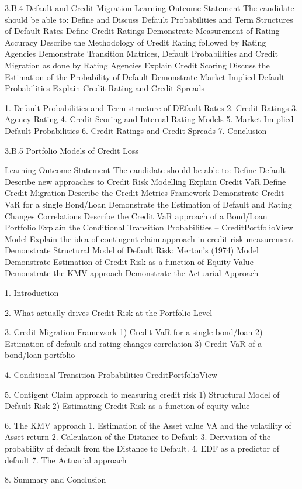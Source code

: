 3.B.4 Default and Credit Migration
Learning Outcome Statement
The candidate should be able to:
 Define and Discuss Default Probabilities and Term Structures of
Default Rates
 Define Credit Ratings
 Demonstrate Measurement of Rating Accuracy
 Describe the Methodology of Credit Rating followed by Rating Agencies
 Demonstrate Transition Matrices, Default Probabilities and Credit Migration
as done by Rating Agencies
 Explain Credit Scoring
 Discuss the Estimation of the Probability of Default
 Demonstrate Market-Implied Default Probabilities
 Explain Credit Rating and Credit Spreads

1. Default Probabilities and Term structure of DEfault Rates
2. Credit Ratings
3. Agency Rating
4. Credit Scoring and Internal Rating Models
5. Market Im plied Default Probabilities
6. Credit Ratings and Credit Spreads
7. Conclusion

3.B.5 Portfolio Models of Credit Loss

Learning Outcome Statement
The candidate should be able to:
 Define Default
 Describe new approaches to Credit Risk Modelling
 Explain Credit VaR
 Define Credit Migration
 Describe the Credit Metrics Framework
 Demonstrate Credit VaR for a single Bond/Loan
 Demonstrate the Estimation of Default and Rating Changes Correlations
 Describe the Credit VaR approach of a Bond/Loan Portfolio
 Explain the Conditional Transition Probabilities – CreditPortfolioView Model
 Explain the idea of contingent claim approach in credit risk measurement
 Demonstrate Structural Model of Default Risk: Merton’s (1974) Model
 Demonstrate Estimation of Credit Risk as a function of Equity Value
 Demonstrate the KMV approach
 Demonstrate the Actuarial Approach

1. Introduction

2. What actually drives Credit Risk at the Portfolio Level

3. Credit Migration Framework
 1) Credit VaR for a single bond/loan
 2) Estimation of default and rating changes correlation
 3) Credit VaR of a bond/loan portfolio

4. Conditional Transition Probabilities CreditPortfolioView

5. Contigent Claim approach to measuring credit risk
 1) Structural Model of Default Risk
 2) Estimating Credit Risk as a function of equity value

6. The KMV approach
	1. Estimation of the Asset value VA and the volatility of Asset return
	2. Calculation of the Distance to Default
	3. Derivation of the probability of default from the Distance to Default.
	4. EDF as a predictor of default
7. The Actuarial approach

8. Summary and Conclusion





